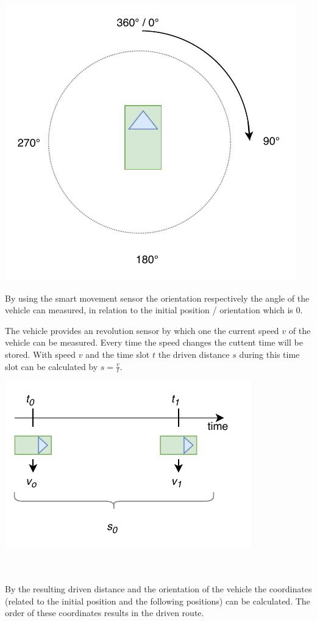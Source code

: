 \begin{minipage}{0.5\textwidth}
\centering
	\includegraphics[scale=0.6]{sources/mapping/orientation.pdf}
\end{minipage}
\begin{minipage}{0.5\textwidth}
By using the smart movement sensor the orientation respectively the angle of the vehicle can measured, in relation to the initial position / orientation which is 0\degree.
\end{minipage}

\begin{minipage}{0.5\textwidth}
The vehicle provides an revolution sensor by which one the current speed $v$ of the vehicle can be measured. Every time the speed changes the cuttent time will be stored. With speed $v$ and the time slot $t$ the driven distance $s$ during this time slot can be calculated by $s=\frac{v}{t}$.
\end{minipage}
\begin{minipage}{0.5\textwidth}
	\centering
	\includegraphics[scale=0.8]{sources/mapping/distance.pdf}
\end{minipage}
\\
\\
By the resulting driven distance and the orientation of the vehicle the coordinates (related to the initial position and the following positions) can be calculated. The order of these coordinates results in the driven route.

